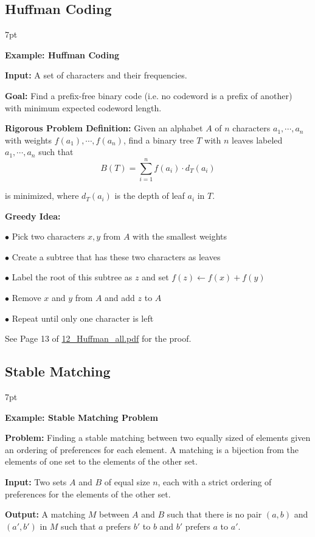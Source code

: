 \documentclass[10pt]{article}
\newenvironment{formal}[2]{%
	\def\FrameCommand{%
		\hspace{1pt}%
		{\color{#1}\vrule width 2pt}%
		{\color{#2}\vrule width 4pt}%
		\colorbox{#2}%
	}%
	\MakeFramed{\advance\hsize-\width\FrameRestore}%
	\noindent\hspace{-4.55pt}%
	\begin{adjustwidth}{}{7pt}%
		\vspace{2pt}\vspace{2pt}%
	}
	{%
		\vspace{2pt}\end{adjustwidth}\endMakeFramed%
}
\begin{document}
\subsection{Huffman Coding}

\begin{formal}{Brown}{brownshade}
	
	\textbf{Example: Huffman Coding}

	\textbf{Input:} A set of characters and their frequencies.

	\textbf{Goal:} Find a prefix-free binary code (i.e. no codeword is a prefix of another) with minimum expected codeword length.

	\textbf{Rigorous Problem Definition:} Given an alphabet $A$ of $n$ characters $a_1,\cdots,a_n$ with weights $f(a_1),\cdots,f(a_n)$, find a binary tree $T$ with $n$ leaves labeled $a_1,\cdots,a_n$ such that
	\[
		B(T) = \sum_{i=1}^n f(a_i) \cdot d_T(a_i)
	\]
	
	is minimized, where $d_T(a_i)$ is the depth of leaf $a_i$ in $T$.
	
	\textbf{Greedy Idea:}

	$\bullet$ Pick two characters $x, y$ from $A$ with the smallest weights
	
	$\bullet$ Create a subtree that has these two characters as leaves

	$\bullet$ Label the root of this subtree as $z$ and set $f(z)\gets f(x)+f(y)$

	$\bullet$ Remove $x$ and $y$ from $A$ and add $z$ to $A$

	$\bullet$ Repeat until only one character is left

\end{formal}

See Page 13 of \href{C:/Users/user/OneDrive\%20-\%20HKUST\%20Connect/University/Computer/Design\%20and\%20Analysis\%20of\%20Algorithms/Lecture\%20Notes/12_Huffman_all.pdf\#page=13}{12\_Huffman\_all.pdf} for the proof.

\subsection{Stable Matching}

\begin{formal}{Brown}{brownshade}
	
	\textbf{Example: Stable Matching Problem}

	\textbf{Problem:} Finding a stable matching between two equally sized of elements given an ordering of preferences for each element. A matching is a bijection from the elements of one set to the elements of the other set.

	\textbf{Input:} Two sets $A$ and $B$ of equal size $n$, each with a strict ordering of preferences for the elements of the other set.

	\textbf{Output:} A matching $M$ between $A$ and $B$ such that there is no pair $(a, b)$ and $(a', b')$ in $M$ such that $a$ prefers $b'$ to $b$ and $b'$ prefers $a$ to $a'$.

\end{formal}
\end{document}
